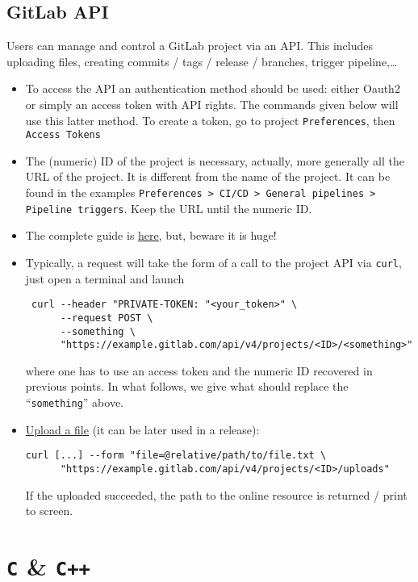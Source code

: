 \documentclass[a4paper,12pt,%
              final%
              ]{article}
\begin{document}
\subsection{GitLab API}
Users can manage and control a GitLab project via an API. This includes uploading files, creating commits / tags / release / branches, trigger pipeline,\ldots
\begin{itemize}
  \item To access the API an authentication method should be used: either Oauth2 or simply an access token with API rights. The commands given below will use this latter method. To create a token, go to project \texttt{Preferences}, then \texttt{Access Tokens}
  \item The (numeric) ID of the project is necessary, actually, more generally all the URL of the project. It is different from the name of the project. It can be found in the examples \texttt{Preferences > CI/CD > General pipelines > Pipeline triggers}. Keep the URL until the numeric ID.
  \item The complete guide is \href{https://docs.gitlab.com/ee/api/}{here}, but, beware it is huge!
  \item Typically, a request will take the form of a call to the project API via \texttt{curl}, just open a terminal and launch
\begin{verbatim}
 curl --header "PRIVATE-TOKEN: "<your_token>" \
      --request POST \
      --something \
      "https://example.gitlab.com/api/v4/projects/<ID>/<something>"
\end{verbatim}
    where one has to use an access token and the numeric ID recovered in previous points. In what follows, we give what should replace the ``\texttt{something}'' above.
  \item \href{https://docs.gitlab.com/ee/api/projects.html#upload-a-file}{Upload a file} (it can be later used in a release):
\begin{verbatim}
curl [...] --form "file=@relative/path/to/file.txt \
      "https://example.gitlab.com/api/v4/projects/<ID>/uploads"
\end{verbatim}
    If the uploaded succeeded, the path to the online resource is returned / print to screen.
\end{itemize}


\section{\texttt{C} \& \texttt{C++}}
\label{sec:c}
\end{document}
